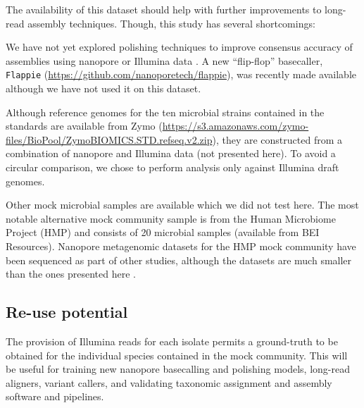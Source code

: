 \documentclass[a4paper,num-refs]{oup-contemporary}
\begin{document}
The availability of this dataset should help with further improvements to long-read assembly techniques. Though, this study has several shortcomings:

We have not yet explored polishing techniques to improve consensus accuracy of assemblies using nanopore or Illumina data \cite{Rang2018-md}. A new ``flip-flop'' basecaller, \texttt{Flappie} (\url{https://github.com/nanoporetech/flappie}), was recently made available although we have not used it on this dataset.

Although reference genomes for the ten microbial strains contained in the standards are available from Zymo (\url{https://s3.amazonaws.com/zymo-files/BioPool/ZymoBIOMICS.STD.refseq.v2.zip}), they are constructed from a combination of nanopore and Illumina data (not presented here). To avoid a circular comparison, we chose to perform analysis only against Illumina draft genomes. 

Other mock microbial samples are available which we did not test here. The most notable alternative mock community sample is from the Human Microbiome Project (HMP) and consists of 20 microbial samples (available from BEI Resources). Nanopore metagenomic datasets for the HMP mock community have been sequenced as part of other studies, although the datasets are much smaller than the ones presented here \cite{Leggett2017-sx,Bertrand2018-lz,Huson2018-bh}.

\subsection{Re-use potential}
The provision of Illumina reads for each isolate permits a ground-truth to be obtained for the individual species contained in the mock community. This will be useful for training new nanopore basecalling and polishing models, long-read aligners, variant callers, and validating taxonomic assignment and assembly software and pipelines.



\end{document}
